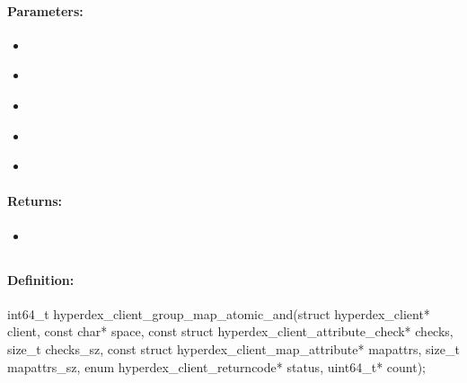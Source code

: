\paragraph{Parameters:}
\begin{itemize}[noitemsep]
\item {}\\

\item {}\\

\item {}\\

\item {}\\

\item {}\\

\end{itemize}

\paragraph{Returns:}
\begin{itemize}[noitemsep]
\item {}\\

\end{itemize}

\pagebreak
\subsection{}
\label{api:c:group_map_atomic_and}


\paragraph{Definition:}
\begin{ccode}
int64_t hyperdex_client_group_map_atomic_and(struct hyperdex_client* client,
        const char* space,
        const struct hyperdex_client_attribute_check* checks, size_t checks_sz,
        const struct hyperdex_client_map_attribute* mapattrs, size_t mapattrs_sz,
        enum hyperdex_client_returncode* status,
        uint64_t* count);
\end{ccode}

